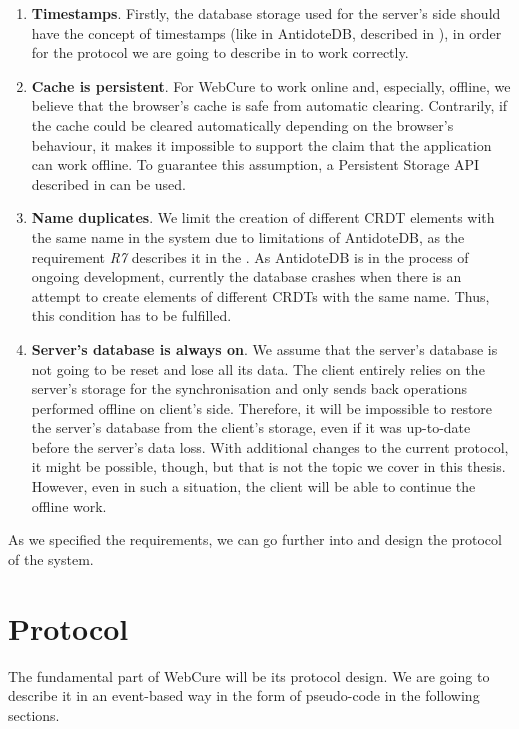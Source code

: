 \begin{enumerate}
\item {\textbf{Timestamps}. Firstly, the database storage used for the server's side should have the concept of timestamps (like in AntidoteDB, described in ), in order for the protocol we are going to describe in  to work correctly.}
\item {\textbf{Cache is persistent}. For WebCure to work online and, especially, offline, we believe that the browser's cache is safe from automatic clearing. Contrarily, if the cache could be cleared automatically depending on the browser's behaviour, it makes it impossible to support the claim that the application can work offline. To guarantee this assumption, a Persistent Storage API described in  can be used.}
\item{\textbf{Name duplicates}. We limit the creation of different CRDT elements with the same name in the system due to limitations of AntidoteDB, as the requirement \textit{R7} describes it in the . As AntidoteDB is in the process of ongoing development, currently the database crashes when there is an attempt to create elements of different CRDTs with the same name. Thus, this condition has to be fulfilled.}
\item{\textbf{Server's database is always on}. We assume that the server's database is not going to be reset and lose all its data. The client entirely relies on the server's storage for the synchronisation and only sends back operations performed offline on client's side. Therefore, it will be impossible to restore the server's database from the client's storage, even if it was up-to-date before the server's data loss. With additional changes to the current protocol, it might be possible, though, but that is not the topic we cover in this thesis. However, even in such a situation, the client will be able to continue the offline work.}
\end{enumerate}

As we specified the requirements, we can go further into and design the protocol of the system.

\section{Protocol}
\label{4-protocol}

The fundamental part of WebCure will be its protocol design. We are going to describe it in an event-based way in the form of pseudo-code in the following sections. 


